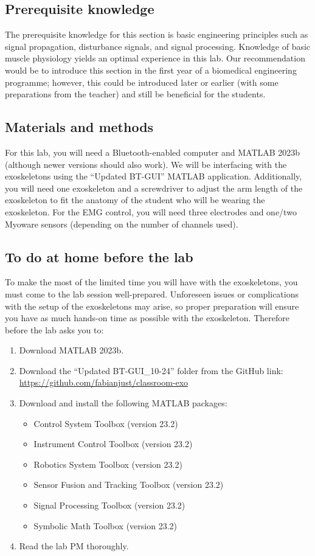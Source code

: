 \subsection{Prerequisite knowledge}
The prerequisite knowledge for this section is basic engineering principles such as signal propagation, disturbance signals, and signal processing. Knowledge of basic muscle physiology yields an optimal experience in this lab. Our recommendation would be to introduce this section in the first year of a biomedical engineering programme; however, this could be introduced later or earlier (with some preparations from the teacher) and still be beneficial for the students.  

\subsection{Materials and methods}
For this lab, you will need a Bluetooth-enabled computer and MATLAB 2023b (although newer versions should also work). We will be interfacing with the exoskeletons using the “Updated BT-GUI” MATLAB application. Additionally, you will need one exoskeleton and a screwdriver to adjust the arm length of the exoskeleton to fit the anatomy of the student who will be wearing the exoskeleton. For the EMG control, you will need three electrodes and one/two Myoware sensors (depending on the number of channels used). 

\subsection{To do at home before the lab}
To make the most of the limited time you will have with the exoskeletons, you must come to the lab session well-prepared. Unforeseen issues or complications with the setup of the exoskeletons may arise, so proper preparation will ensure you have as much hands-on time as possible with the exoskeleton. Therefore before the lab asks you to:  
\begin{enumerate}[]
	\item Download MATLAB 2023b.
	\item Download the “Updated BT-GUI\_10-24”  folder from the GitHub link: \url{https://github.com/fabianjust/classroom-exo}
	\item Download and install the following MATLAB packages: 
	\begin{itemize}[]
		\item Control System Toolbox (version 23.2)
		\item Instrument Control Toolbox (version 23.2)
		\item Robotics System Toolbox (version 23.2)
		\item Sensor Fusion and Tracking Toolbox (version 23.2)
		\item Signal Processing Toolbox (version 23.2)
		\item Symbolic Math Toolbox (version 23.2)
	\end{itemize}
	\item Read the lab PM thoroughly.
\end{enumerate}


